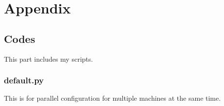 \documentclass[12pt,a4paper]{article}
\begin{document}




\section*{Appendix}

\subsection*{Codes}
This part includes my scripts.
\subsubsection*{default.py}
This is for parallel configuration for multiple machines at the same time.
\end{document}
